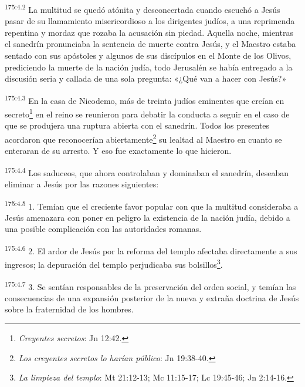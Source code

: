 \par
\textsuperscript{175:4.2} La multitud se quedó atónita y desconcertada cuando escuchó a Jesús pasar de su llamamiento misericordioso a los dirigentes judíos, a una reprimenda repentina y mordaz que rozaba la acusación sin piedad. Aquella noche, mientras el sanedrín pronunciaba la sentencia de muerte contra Jesús, y el Maestro estaba sentado con sus apóstoles y algunos de sus discípulos en el Monte de los Olivos, prediciendo la muerte de la nación judía, todo Jerusalén se había entregado a la discusión seria y callada de una sola pregunta: «¿Qué van a hacer con Jesús?»

\par
\textsuperscript{175:4.3} En la casa de Nicodemo, más de treinta judíos eminentes que creían en secreto\footnote{\textit{Creyentes secretos}: Jn 12:42.} en el reino se reunieron para debatir la conducta a seguir en el caso de que se produjera una ruptura abierta con el sanedrín. Todos los presentes acordaron que reconocerían abiertamente\footnote{\textit{Los creyentes secretos lo harían público}: Jn 19:38-40.} su lealtad al Maestro en cuanto se enteraran de su arresto. Y eso fue exactamente lo que hicieron.

\par
\textsuperscript{175:4.4} Los saduceos, que ahora controlaban y dominaban el sanedrín, deseaban eliminar a Jesús por las razones siguientes:

\par
\textsuperscript{175:4.5} 1. Temían que el creciente favor popular con que la multitud consideraba a Jesús amenazara con poner en peligro la existencia de la nación judía, debido a una posible complicación con las autoridades romanas.

\par
\textsuperscript{175:4.6} 2. El ardor de Jesús por la reforma del templo afectaba directamente a sus ingresos; la depuración del templo perjudicaba sus bolsillos\footnote{\textit{La limpieza del templo}: Mt 21:12-13; Mc 11:15-17; Lc 19:45-46; Jn 2:14-16.}.

\par
\textsuperscript{175:4.7} 3. Se sentían responsables de la preservación del orden social, y temían las consecuencias de una expansión posterior de la nueva y extraña doctrina de Jesús sobre la fraternidad de los hombres.

